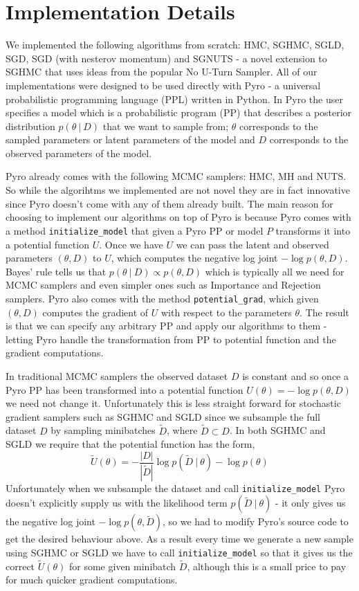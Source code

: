 
\section{Implementation Details}

We implemented the following algorithms from scratch: HMC, SGHMC, SGLD, SGD, SGD (with nesterov momentum) and SGNUTS - a novel extension to SGHMC that uses ideas from the popular No U-Turn Sampler.  All of our implementations were designed to be used directly with Pyro - a universal probabilistic programming language (PPL) written in Python. In Pyro the user specifies a model which is a probabilistic program (PP) that describes a posterior distribution $p(\theta \: | \: D)$ that we want to sample from; $\theta$ corresponds to the sampled parameters or latent parameters of the model and $D$ corresponds to the observed parameters of the model. 

Pyro already comes with the following MCMC samplers: HMC, MH and NUTS. So while the algorihtms we implemented are not novel they are in fact innovative since Pyro doesn't come with any of them already built. The main reason for choosing to implement our algorithms on top of Pyro is because Pyro comes with a method \texttt{initialize\_model} that given a Pyro PP or model $P$ transforms it into a potential function $U$. Once we have $U$ we can pass the latent and observed parameters $(\theta, D)$ to $U$, which computes the negative log joint $- \log p(\theta, D)$. Bayes' rule tells us that  $p(\theta \: | \: D) \propto p(\theta, D)$ which is typically all we need for MCMC samplers and even simpler ones such as Importance and Rejection samplers. Pyro also comes with the method \texttt{potential\_grad}, which given $(\theta, D)$ computes the gradient of $U$ with respect to the parameters $\theta$. The result is that we can specify any arbitrary PP and apply our algorithms to them - letting Pyro handle the transformation from PP to potential function and the gradient computations.

In traditional MCMC samplers the observed dataset $D$ is constant and so once a Pyro PP has been transformed into a potential function $U(\theta) = - \log p(\theta, D)$ we need not change it. Unfortunately this is less straight forward for stochastic gradient samplers such as SGHMC and SGLD since we subsample the full dataset $D$ by sampling minibatches $\tilde{D}$, where $\tilde{D} \subset D$. In both SGHMC and SGLD we require that the potential function has the form,
$$\tilde{U}(\theta) =  -\frac{|D|}{|\tilde{D}|} \log p(\tilde{D} \: | \: \theta) - \log p (\theta)$$
Unfortunately when we subsample the dataset and call \texttt{initialize\_model} Pyro doesn't explicitly supply us with the likelihood term $p(\tilde{D} \: | \: \theta)$ - it only gives us the negative log joint $- \log p(\theta, \tilde{D})$, so we had to modify Pyro's source code to get the desired behaviour above. As a result every time we generate a new sample using SGHMC or SGLD we have to call \texttt{initialize\_model} so that it gives us the correct $\tilde{U}(\theta)$ for some given minibatch $\tilde{D}$, although this is a small price to pay for much quicker gradient computations.